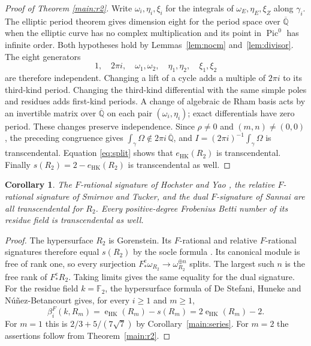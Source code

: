 \documentclass[11pt,a4paper,reqno]{amsart}
\numberwithin{equation}{section}
\theoremstyle{plain}
\newtheorem{corollary}[theorem]{Corollary}
\DeclareMathOperator{\Pic}{Pic}
\newcommand{\eHK}{\operatorname{e}_{\mathrm{HK}}}
\begin{document}
\begin{proof}[Proof of Theorem \ref{main:r2}]
Write $\omega_i,\eta_i,\xi_i$ for the integrals of $\omega_E,\eta_E,\xi_Z$ along $\gamma_i$. The elliptic period theorem \cite[Theorem~2 and Section~3.4]{Wuestholz2021} gives dimension eight for the period space over $\overline{\mathbb Q}$ when the elliptic curve has no complex multiplication and its point in $\Pic^0$ has infinite order. Both hypotheses hold by Lemmas~\ref{lem:nocm} and~\ref{lem:divisor}. The eight generators
\[
 1,\quad 2\pi i,\quad \omega_1,\omega_2,\quad
 \eta_1,\eta_2,\quad \xi_1,\xi_2
\]
are therefore independent. Changing a lift of a cycle adds a multiple of $2\pi i$ to its third-kind period. Changing the third-kind differential with the same simple poles and residues adds first-kind periods. A change of algebraic de Rham basis acts by an invertible matrix over $\overline{\mathbb Q}$ on each pair $(\omega_i,\eta_i)$; exact differentials have zero period. These changes preserve independence. Since $\rho\ne0$ and $(m,n)\ne(0,0)$, the preceding congruence gives
$\int_\gamma\Omega\notin2\pi i\,\overline{\mathbb Q}$, and
$I=(2\pi i)^{-1}\int_\gamma\Omega$ is transcendental. Equation \eqref{eq:split} shows that $e_{\mathrm{HK}}(R_2)$ is transcendental. Finally
$s(R_2)=2-e_{\mathrm{HK}}(R_2)$ is transcendental as well.
\end{proof}

\begin{corollary}
The $F$-rational signature of Hochster and Yao \cite{HY}, the relative $F$-rational signature of Smirnov and Tucker, and the dual $F$-signature of Sannai \cite{Sannai} are all transcendental for $R_2$. Every positive-degree Frobenius Betti number of its residue field is transcendental as well.
\end{corollary}
\begin{proof}
The hypersurface $R_2$ is Gorenstein. Its $F$-rational and relative $F$-rational signatures therefore equal $s(R_2)$ by the socle formula \cite[Introduction and Proposition~3.15]{ST}. Its canonical module is free of rank one, so every surjection $F_*^e\omega_{R_2}\to\omega_{R_2}^{\oplus n}$ splits. The largest such $n$ is the free rank of $F_*^eR_2$. Taking limits gives the same equality for the dual signature. For the residue field $k=\mathbb F_2$, the hypersurface formula of De Stefani, Huneke and N\'u\~nez-Betancourt \cite[Example~3.2]{DSHN} gives, for every $i\ge1$ and $m\ge1$,
\[
 \beta_i^F(k,R_m)=\eHK(R_m)-s(R_m)=2\eHK(R_m)-2.
\]
For $m=1$ this is $2/3+5/(7\sqrt7)$ by Corollary~\ref{main:series}. For $m=2$ the assertions follow from Theorem~\ref{main:r2}.
\end{proof}
\end{document}

